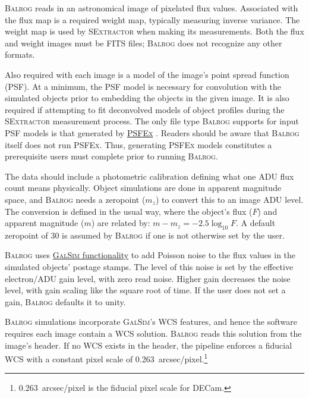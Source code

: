 \documentclass[11pt]{book}
\newcommand{\galsim}{\textsc{GalSim}}
\newcommand{\balrog}{\textsc{Balrog}}
\newcommand{\sex}{\textsc{SExtractor}}
\newcommand{\psfex}{\textsc{PSFEx}}
\begin{document}
\hypertarget{hyper:image}{}
\balrog{} reads in an astronomical image of pixelated flux values.
Associated with the flux map is a required weight map, typically measuring inverse variance.
The weight map is used by \sex{} when making its measurements.
Both the flux and weight images must be FITS files; %
\balrog{} does not recognize any other formats.

\hypertarget{hyper:psf}{}
Also required with each image is a model of the image's point spread function (PSF).
At a minimum, the PSF model is necessary for convolution with the simulated objects
prior to  embedding the objects in the given image.
It is also required if attempting to fit deconvolved models of object profiles during the \sex{} measurement process.
The only file type \balrog{} supports for input PSF models is that generated by 
\href{http://www.astromatic.net/software/psfex}{\psfex{}} \citep{psfex}.
Readers should be aware that \balrog{} itself does not run \psfex{}.
Thus, generating \psfex{} models constitutes a prerequisite users must complete prior to running \balrog{}.

\hypertarget{hyper:zeropoint}{}
The data should include a photometric calibration defining what one ADU flux count means physically. 
Object simulations are done in apparent magnitude space, 
and \balrog{} needs a zeropoint ($m_z$) to convert this to an image ADU level.
The conversion is defined in the usual way, where the object's flux ($F$) and apparent magnitude ($m$) are related by:
$m - m_ z = -2.5 \log_{10} F$.
A default zeropoint of 30 is assumed by \balrog{} if one is not otherwise set by the user.

\hypertarget{hyper:gain}{}
\balrog{} uses \href{http://galsim-developers.github.io/GalSim/classgalsim\_1\_1\_c\_c\_d\_noise.html}{\galsim{} functionality} 
to add Poisson noise to the flux values in the simulated objects' postage stamps.
The level of this noise is set by the effective electron/ADU gain level, with zero read noise.
Higher gain decreases the noise level, with gain scaling like the square root of time.
If the user does not set a gain, \balrog{} defaults it to unity.

\hypertarget{hyper:wcs}{}
\balrog{} simulations incorporate \galsim{}'s WCS features, and hence
the software requires each image contain a WCS solution. \balrog{} reads this solution from the image's header.
If no WCS exists in the header, the pipeline enforces a fiducial WCS with a constant pixel scale of 
0.263~arcsec/pixel.\footnote{0.263~arcsec/pixel is the fiducial pixel scale for DECam.}
\end{document}

